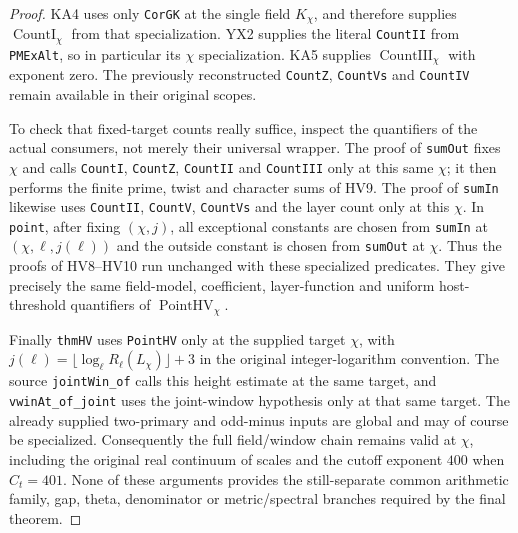 \begin{proof}
KA4 uses only \texttt{CorGK} at the single field $K_\chi$, and
therefore supplies $\operatorname{CountI}_\chi$ from that
specialization.  YX2 supplies the literal \texttt{CountII} from
\texttt{PMExAlt}, so in particular its $\chi$ specialization.
KA5 supplies $\operatorname{CountIII}_\chi$ with exponent zero.
The previously reconstructed \texttt{CountZ}, \texttt{CountVs}
and \texttt{CountIV} remain available in their original scopes.

To check that fixed-target counts really suffice, inspect the
quantifiers of the actual consumers, not merely their universal
wrapper.  The proof of \texttt{sumOut} fixes $\chi$ and calls
\texttt{CountI}, \texttt{CountZ}, \texttt{CountII} and
\texttt{CountIII} only at this same $\chi$; it then performs
the finite prime, twist and character sums of HV9.  The proof of
\texttt{sumIn} likewise uses \texttt{CountII}, \texttt{CountV},
\texttt{CountVs} and the layer count only at this $\chi$.
In \texttt{point}, after fixing $(\chi,j)$, all exceptional
constants are chosen from \texttt{sumIn} at
$(\chi,\ell,j(\ell))$ and the outside constant is chosen from
\texttt{sumOut} at $\chi$.  Thus the proofs of HV8--HV10 run
unchanged with these specialized predicates.  They give precisely
the same field-model, coefficient, layer-function and uniform
host-threshold quantifiers of $\operatorname{PointHV}_\chi$.

Finally \texttt{thmHV} uses \texttt{PointHV} only at the supplied
target $\chi$, with
$j(\ell)=\lfloor\log_\ell R_\ell(L_\chi)\rfloor+3$ in the
original integer-logarithm convention.  The source \texttt{jointWin\_of}
calls this height estimate at the same target, and
\texttt{vwinAt\_of\_joint} uses the joint-window hypothesis only
at that same target.  The already supplied two-primary and
odd-minus inputs are global and may of course be specialized.
Consequently the full field/window chain remains valid at
$\chi$, including the original real continuum of scales and
the cutoff exponent $400$ when $C_t=401$.  None of these
arguments provides the still-separate common arithmetic family,
gap, theta, denominator or metric/spectral branches required
by the final theorem.
\end{proof}

